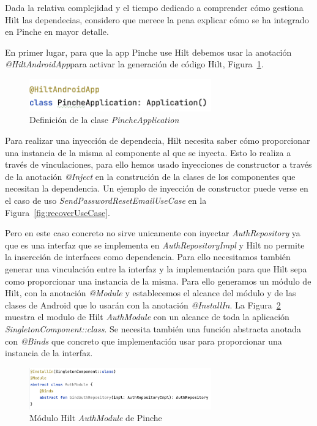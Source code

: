 Dada la relativa complejidad y el tiempo dedicado a comprender cómo gestiona Hilt las dependecias, considero que merece la pena explicar cómo se ha integrado en Pinche en mayor detalle.

En primer lugar, para que la app Pinche use Hilt debemos usar la anotación \textit{@HiltAndroidApp}para activar la generación de código Hilt, Figura~\ref{fig:pincheAppHilt}.

\begin{figure}[H]
\centering
\includegraphics[width=0.7\textwidth]{./img/description/pinche_app_hilt.png}
\caption{Definición de la clase \textit{PincheApplication}}
\label{fig:pincheAppHilt}
\end{figure}

Para realizar una inyección de dependecia, Hilt necesita saber cómo proporcionar una instancia de la misma al componente al que se inyecta. Esto lo realiza a través de vinculaciones, para ello hemos usado inyecciones de constructor a través de la anotación \textit{@Inject} en la construción de la clases de los componentes que necesitan la dependencia. Un ejemplo de inyección de constructor puede verse en el caso de uso \textit{SendPasswordResetEmailUseCase} en la Figura~\ref{fig:recoverUseCase}.

Pero en este caso concreto no sirve unicamente con inyectar \textit{AuthRepository} ya que es una interfaz que se implementa en \textit{AuthRepositoryImpl} y Hilt no permite la insercción de interfaces como dependencia. Para ello necesitamos también generar una vinculación entre la interfaz y la implementación para que Hilt sepa como proporcionar una instancia de la misma. Para ello generamos un módulo de Hilt, con la anotación \textit{@Module} y establecemos el alcance del módulo y de las clases de Android que lo usarán con la anotación \textit{@InstallIn}. La Figura~\ref{fig:authModuleHilt} muestra el modulo de Hilt \textit{AuthModule} con un alcance de toda la aplicación \textit{SingletonComponent::class}. Se necesita también una función abstracta anotada con \textit{@Binds} que concreto que implementación usar para proporcionar una instancia de la interfaz.

\begin{figure}[H]
\centering
\includegraphics[width=0.7\textwidth]{./img/description/auth_module_hilt.png}
\caption{Módulo Hilt \textit{AuthModule} de Pinche}
\label{fig:authModuleHilt}
\end{figure}


